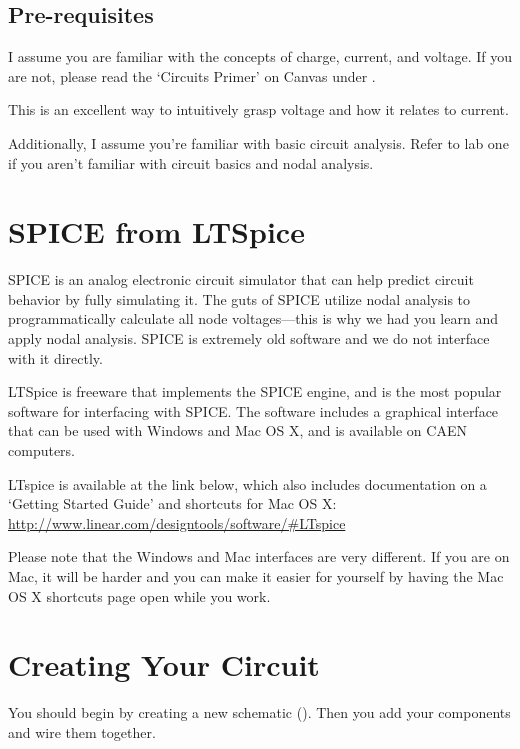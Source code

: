 \documentclass{article}
\begin{document}
\subsection{Pre-requisites}
I assume you are familiar with the concepts of charge, current, and voltage. If
you are not, please read the `Circuits Primer' on Canvas under . 

This is an excellent way to intuitively grasp voltage and how it relates to current.

Additionally, I assume you're familiar with basic circuit analysis. Refer to lab one if you aren't familiar with circuit basics and nodal analysis.

\section{SPICE from LTSpice}
SPICE is an analog electronic circuit simulator that can help predict circuit behavior by fully simulating it. The guts of SPICE utilize nodal analysis to programmatically calculate all node voltages—this is why we had you learn and apply nodal analysis. SPICE is extremely old software and we do not interface with it directly.

LTSpice is freeware that implements the SPICE engine, and is the most popular software for interfacing with SPICE. The software includes a graphical interface that can be used with Windows and Mac OS X, and is available on CAEN computers.

LTspice is available at the link below, which also includes documentation on a
‘Getting Started Guide’ and shortcuts for Mac OS X:
\url{http://www.linear.com/designtools/software/#LTspice}

Please note that the Windows and Mac interfaces are very different. If you are on Mac, it will be harder and you can make it easier for yourself by having the Mac OS X shortcuts page open while you work.

\section{Creating Your Circuit}

You should begin by creating a new schematic (). Then you add your components and wire them together.
\end{document}
